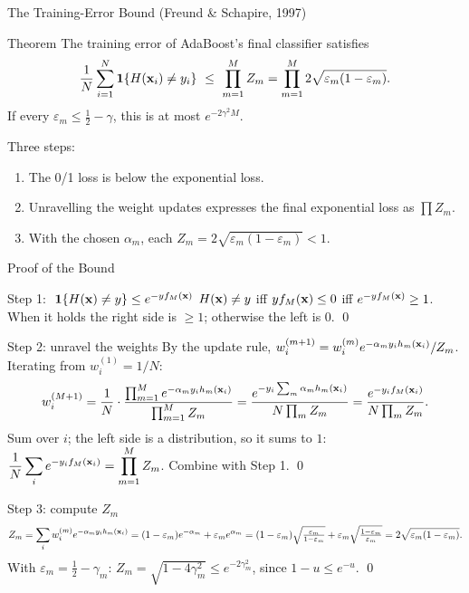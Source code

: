 \documentclass[11pt,aspectratio=169]{beamer}
\begin{document}
\begin{frame}{The Training-Error Bound (Freund \& Schapire, 1997)}
\begin{claim}{Theorem}
The training error of AdaBoost's final classifier satisfies
\[
\frac1N\sum_{i=1}^N\ind{H(\vx_i)\ne y_i}\ \le\ \prod_{m=1}^MZ_m=\prod_{m=1}^M2\sqrt{\varepsilon_m(1-\varepsilon_m)} .
\]
If every $\varepsilon_m\le\tfrac12-\gamma$, this is at most $e^{-2\gamma^2M}$.
\end{claim}
\vspace{6pt}
Three steps:
\begin{enumerate}
  \item The 0/1 loss is below the exponential loss.
  \item Unravelling the weight updates expresses the final exponential loss as $\prod Z_m$.
  \item With the chosen $\alpha_m$, each $Z_m=2\sqrt{\varepsilon_m(1-\varepsilon_m)}<1$.
\end{enumerate}
\end{frame}

\begin{frame}{Proof of the Bound}\scriptsize
\begin{derivation}{Step 1: $\ \mathbf{1}\!\left\{H(\mathbf{x})\ne y\right\}\le e^{-yf_M(\mathbf{x})}$}
$H(\mathbf{x})\ne y$ iff $yf_M(\mathbf{x})\le0$ iff $e^{-yf_M(\mathbf{x})}\ge1$. When it holds the right side is $\ge1$; otherwise the left is $0$. \qed
\end{derivation}
\begin{derivation}{Step 2: unravel the weights}
By the update rule, $w_i^{(m+1)}=w_i^{(m)}e^{-\alpha_my_ih_m(\mathbf{x}_i)}/Z_m$. Iterating from $w_i^{(1)}=1/N$:
\[
w_i^{(M+1)}=\frac1N\cdot\frac{\prod_{m=1}^Me^{-\alpha_my_ih_m(\mathbf{x}_i)}}{\prod_{m=1}^MZ_m}
=\frac{e^{-y_i\sum_m\alpha_mh_m(\mathbf{x}_i)}}{N\prod_mZ_m}=\frac{e^{-y_if_M(\mathbf{x}_i)}}{N\prod_mZ_m}.
\]
Sum over $i$; the left side is a distribution, so it sums to $1$: \quad
$\displaystyle\frac1N\sum_ie^{-y_if_M(\mathbf{x}_i)}=\prod_{m=1}^MZ_m$. Combine with Step 1. \qed
\end{derivation}
\begin{derivation}{Step 3: compute $Z_m$}
\[
Z_m=\sum_iw_i^{(m)}e^{-\alpha_my_ih_m(\mathbf{x}_i)}=(1-\varepsilon_m)e^{-\alpha_m}+\varepsilon_me^{\alpha_m}
=(1-\varepsilon_m)\sqrt{\tfrac{\varepsilon_m}{1-\varepsilon_m}}+\varepsilon_m\sqrt{\tfrac{1-\varepsilon_m}{\varepsilon_m}}
=2\sqrt{\varepsilon_m(1-\varepsilon_m)} .
\]
With $\varepsilon_m=\tfrac12-\gamma_m$: $Z_m=\sqrt{1-4\gamma_m^2}\le e^{-2\gamma_m^2}$, since $1-u\le e^{-u}$. \qed
\end{derivation}\vspace{-6pt}
\end{frame}
\end{document}
